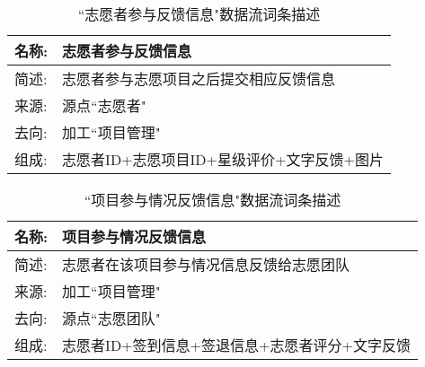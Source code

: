     
    \begin{table}[H]  
    \caption{``志愿者参与反馈信息"数据流词条描述}  
    \begin{center}  
        \begin{tabular}{l p{11cm}} 
            \hline
            \quad 名称: & 志愿者参与反馈信息 \\
            \hline
            \quad 简述: & 志愿者参与志愿项目之后提交相应反馈信息 \\
            \hline
            \quad 来源: & 源点``志愿者" \\
            \hline
            \quad 去向: & 加工``项目管理" \\
            \hline
            \quad 组成: & 志愿者ID+志愿项目ID+星级评价+文字反馈+图片\\
            \hline
        \end{tabular}
        \label{tab1}
    \end{center}
    \end{table}


    \begin{table}[H]  
    \caption{``项目参与情况反馈信息"数据流词条描述}  
    \begin{center}  
        \begin{tabular}{l p{11cm}} 
            \hline
            \quad 名称: & 项目参与情况反馈信息 \\
            \hline
            \quad 简述: & 志愿者在该项目参与情况信息反馈给志愿团队 \\
            \hline
            \quad 来源: & 加工``项目管理" \\
            \hline
            \quad 去向: & 源点``志愿团队" \\
            \hline
            \quad 组成: & {志愿者ID+签到信息+签退信息+志愿者评分+文字反馈}\\
            \hline
        \end{tabular}
        \label{tab1}
    \end{center}
    \end{table}
    